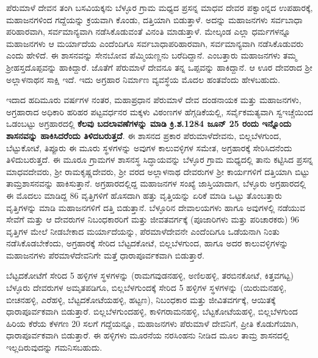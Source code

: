 ಪೆರುಮಾಳೆ ದೇವನ ತಂಗಿ ಬಸವಿಯಕ್ಕನು ಬೆಳ್ಳೂರ ಗ್ರಾಮ ಮಧ್ಯದ ಪ್ರಸನ್ನ ಮಾಧವ ದೇವರ ಪಕ್ವಾಂನ್ನದ ಉಪಹಾರಕ್ಕೆ, ಮಹಾಜನಗಳಿಂದ ಗದ್ದೆಯನ್ನು ಕ್ರಯವಾಗಿ ಕೊಂಡು, ದತ್ತಿಯಾಗಿ ಬಿಡುತ್ತಾಳೆ. ಅದನ್ನು ಮಹಾಜನಗಳು ಸರ್ವಬಾಧಾ ಪರಿಹಾರವಾಗಿ, ಸರ್ವಮಾನ್ಯವಾಗಿ ನಡೆಸಿಕೊಡುವಂತೆ ವಿನಂತಿ ಮಾಡುತ್ತಾಳೆ. ಮೇಲ್ಕಂಡ ಎಲ್ಲಾ ಧರ್ಮಗಳನ್ನೂ ಮಹಾಜನಗಳು ಆ ಮರ್ಯಾದೆಯ ಎಂದೆಂದಿಗೂ ಸರ್ವಬಾಧಾಪರಿಹಾರವಾಗಿ, ಸರ್ವಮಾನ್ಯವಾಗಿ ನಡೆಸಿಕೊಡುವರು ಎಂದು ಹೇಳಿದೆ. ಈ ಶಾಸನವನ್ನು ಸೇನಬೋವ ಪೆಮ್ಮಿಯಣ್ಣನು ಬರೆದಿದ್ದಾನೆ. ಎಂಬತ್ತಾರು ಮಹಾಜನಗಳು ತಮ್ಮ ಶ‍್ರೀಹಸ್ತದೊಪ್ಪವನ್ನು ಹಾಕಿದ್ದಾರೆ. ಜೊತೆಗೆ ಪೆರುಮಾಳೆ ದೇವನೂ ತನ್ನ ಒಪ್ಪವನ್ನು ಹಾಕಿದ್ದಾನೆ. ಆ ಊರ ದೇವರಾದ ಶ‍್ರೀ ಅಲ್ಲಾಳನಾಥನ ಸಾಕ್ಷಿ ಇದೆ. ಇದು ಅಗ್ರಹಾರ ನಿರ್ಮಾಣ ವ್ಯವಸ್ಥೆಯ ಮೊದಲ ಹಂತವೆಂದು ಹೇಳಬಹುದು.

ಇದಾದ ಹದಿಮೂರು ವರ್ಷಗಳ ನಂತರ, ಮಹಾಪ್ರಧಾನ ಪೆರುಮಾಳೆ ದೇವ ದಂಡನಾಯಕ ಮತ್ತು ಮಹಾಜನಗಳು, ಅಗ್ರಹಾರಾದ ಅಧಿಕಾರಿ ಹರಿಹರ ಪಟ್ಟವರ್ಧನರ ಮಕ್ಕಳು ವಿಠಂಣಗಳ ಹೆಗ್ಗಡಿಕೆಯಲ್ಲಿ, ಸರ್ವೈಕಮತ್ಯವಾಗಿ ಸ್ವಇಚ್ಚೆಯಿಂದ ಒಡಂಬಟ್ಟು ಅಗ್ರಹಾರದಲ್ಲಿ \textbf{ಕೆಲವು ಬದಲಾವಣೆಗಳನ್ನು ಮಾಡಿ ಕ್ರಿ.ಶ.1284 ಜೂನ್​ 25 ರಂದು ಇನ್ನೊಂದು ಶಾಸನವನ್ನು ಹಾಕಿಸಿದರೆಂದು ತಿಳಿದಬರುತ್ತದೆ}. ಈ ಶಾಸನದ ಪ್ರಕಾರ ಪೆರುಮಾಳೆದೇವನು, ಬಿಲ್ಲಬೆಳಗುಂದ, ಬೆಟ್ಟುಕೋಟೆ, ತಿಪ್ಪೂರು ಈ ಮೂರು ಸ್ಥಳಗಳನ್ನು ಅವುಗಳ ಕಾಲುವಳ್ಳಿಗಳ ಸಮೇತ, ಅಗ್ರಹಾರಕ್ಕೆ ಸೇರಿಸಿದನೆಂದು ತಿಳಿದುಬರುತ್ತದೆ. ಈ ಮೂರೂ ಗ್ರಾಮಗಳ ಶಾಸನಸ್ಥ ಸಿದ್ಧಾಯವನ್ನು ಬೆಳ್ಳೂರ ಗ್ರಾಮ ಮಧ್ಯದಲ್ಲಿ ತಾನು ಕಟ್ಟಿಸಿದ ಪ್ರಸನ್ನ ಮಾಧವದೇವರು, ಶ‍್ರೀ ರಾಮಕೃಷ್ಣದೇವರು, ಶ‍್ರೀ ವರದ ಅಲ್ಲಾಳನಾಥ ದೇವರುಗಳ ಶ‍್ರೀ ಕಾರ್ಯಗಳಿಗೆ ದತ್ತಿಯಾಗಿ ಬಿಟ್ಟು ತಾಮ್ರಶಾಸನವನ್ನು ಹಾಕಿಸುತ್ತಾನೆ. ಅಗ್ರಹಾರದಲ್ಲಿದ್ದ ಮಹಾಜನಗಳ ಸಂಖ್ಯೆ ಜಾಸ್ತಿಯಾದಾಗ, ಬೆಳ್ಳೂರು ಅಗ್ರಹಾರದಲ್ಲಿ ಈ ಮೊದಲು ಮಾಡಿದ್ದ 86 ವೃತ್ತಿಗಳಿಗೆ ಹೊಸದಾಗಿ ಹತ್ತು ವೃತ್ತಿಯನ್ನು ಏರಿಕೆ ಮಾಡಿ ಒಟ್ಟು ತೊಂಬತ್ತಾರು ವೃತ್ತಿಗಳನ್ನು ಮಾಡಿ ಮಹಾಜನಗಳಿಗೆ ದತ್ತಿ ಬಿಡುತ್ತಾನೆ. ಬೆಳ್ಳೂರಿನ ದೇವಾಲಯಗಳು ಹಾಗೂ ಅವುಗಳಲ್ಲಿ ನಡೆಯುವ ಸೇವೆಗೆ ಮತ್ತು ಆ ದೇವರುಗಳ ನಿಬಂಧಕಾರರಿಗೆ ಮತ್ತು ಜೀವತವರ್ಗಕ್ಕೆ (ಪೂಜಾರಿಗಳು ಮತ್ತು ಪರಿಚಾರಕರು) 96 ವೃತ್ತಿಗಳ ಮೇಲೆ ನೀಡಬೇಕಾದ ಮರ್ಯಾದೆಯನ್ನು, ಪೆರಮಾಳೆದೇವನೇ ಎಂದೆಂದಿಗೂ ಒಡೆಯನಾಗಿ ನಿಂತು ನಡೆಸಿಕೊಡಬೇಕೆಂದು, ಅಗ್ರಹಾರಕ್ಕೆ ಸೇರಿದ ಬೆಟ್ಟದಕೋಟೆ, ಬಿಲ್ಲಬೆಳಗುಂದ, ಹಾಗೂ ಅದರ ಕಾಲುವಳ್ಳಿಗಳನ್ನು ಮಹಾಜನಗಳು ಪೆರಮಾಳೆದೇವನಿಗೇ ಮತ್ತೆ ಧಾರಾಪೂರ್ವಕವಾಗಿ ಬಿಡುತ್ತಾರೆ.

ಬೆಟ್ಟದಕೋಟೆಗೆ ಸೇರಿದ 5 ಹಳ್ಳಿಗಳ ಸ್ಥಳಗಳನ್ನು (ರಾಮಗವುಡನಹಳ್ಳಿ, ಅಣಿಲಹಳ್ಳಿ, ತರಬಿನಕೋಟೆ, ಕಿತ್ತವಗಟ್ಟ) ಬೆಳ್ಳೂರು ದೇವರುಗಳ ಅಮೃತಪಡಿಗೂ, ಬಿಲ್ಲಬೆಳಗುಂದಕ್ಕೆ ಸೇರಿದ 5 ಹಳ್ಳಿಗಳ ಸ್ಥಳಗಳನ್ನು (ಯಿರುಮನಹಳ್ಳಿ, ಬೀಚನಹಳ್ಳಿ, ಎರೆಹಳ್ಳಿ, ಬೆಟ್ಟದಕೋಟೆಯಹಳ್ಳಿ, ಹಟ್ಟಣ), ನಿಬಂಧಕಾರ ಮತ್ತು ಜೀವಿತವರ್ಗಕ್ಕೆ, ಆಯಿತಕ್ಕೆ ಧಾರಾ\-ಪೂರ್ವಕವಾಗಿ ಬಿಡುತ್ತಾರೆ. ಬಿಲ್ಲಬೆಳಗುಂದಹಳ್ಳಿ, ಕಾಳಿಗರಾಮನಹಳ್ಳಿ, ಬೆಟ್ಟಕೋಟೆಯಹಳ್ಳಿ, ಬಿಲ್ಲಬೆಳಗುಂದ ಹಿರಿಯ ಕೆರೆಯ ಕೆಳಗಣ 20 ಸಲಗೆ ಗದ್ದೆಯನ್ನೂ, ಮಹಾಜನಗಳು ಪೆರುಮಾಳೆ ದೇವನಿಗೆ, ಪ್ರೀತಿ ಕೊಡುಗೆಯಾಗಿ, ಧಾರಾಪೂರ್ವಕವಾಗಿ ಬಿಡುತ್ತಾರೆ. ಈ ಹಳ್ಳಿಗಳು ಮೂರನೆಯ ನರಸಿಂಹನು ನೀಡಿದ ಮೂಲ ತಾಮ್ರ ಶಾಸನದಲ್ಲಿ ಇಲ್ಲದಿರುವುದನ್ನು ಗಮನಿಸಬಹುದು.

